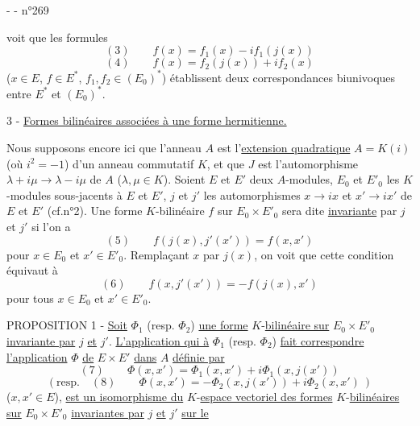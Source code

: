 -  -
\hfill n°269

voit que les formules
\[
(3)\qquad f(x)=f_1(x)-if_1(j(x))
\]
\[
(4)\qquad f(x)=f_2(j(x))+if_2(x)
\]
($x\in E$, $f\in E^*$, $f_1,f_2\in(E_0)^*$) établissent deux correspondances biunivoques entre $E^*$ et $(E_0)^*$.

3 - \uline{Formes bilinéaires associées à une forme hermitienne.}

Nous supposons encore ici que l'anneau $A$ est l'\uline{extension quadratique} $A=K(i)$ (où $i^2=-1$) d'un anneau commutatif $K$, et que $J$ est l'automorphisme $\lambda+i\mu\longrightarrow\lambda-i\mu$ de $A$ ($\lambda,\mu\in K$). Soient $E$ et $E'$ deux $A$-modules, $E_0$ et $E'_0$ les $K$-modules sous-jacents à $E$ et $E'$, $j$ et $j'$ les automorphismes $x\longrightarrow ix$ et $x'\longrightarrow ix'$ de $E$ et $E'$ (cf.n°2). Une forme $K$-bilinéaire $f$ sur $E_0\times E'_0$ sera dite \uline{invariante} par $j$ et $j'$ si l'on a
\[
(5)\qquad f(j(x),j'(x'))=f(x,x')
\]
pour $x\in E_0$ et $x'\in E'_0$. Remplaçant $x$ par $j(x)$, on voit que cette condition équivaut à
\[
(6)\qquad f(x,j'(x'))=-f(j(x),x')
\]
pour tous $x\in E_0$ et $x'\in E'_0$.

PROPOSITION 1 - \uline{Soit} $\Phi_1$ (resp. $\Phi_2$) \uline{une forme} $K$-\uline{bilinéaire sur} $E_0\times E'_0$ \uline{invariante par} $j$ \uline{et} $j'$. \uline{L'application qui à} $\Phi_1$ (resp. $\Phi_2$) \uline{fait correspondre l'application} $\Phi$ \uline{de} $E\times E'$ \uline{dans} $A$ \uline{définie par}
\[
(7)\qquad\Phi(x,x')=\Phi_1(x,x')+i\Phi_1(x,j(x'))
\]
\[
(\text{resp.}\quad(8)\qquad\Phi(x,x')=-\Phi_2(x,j(x'))+i\Phi_2(x,x')\ )
\]
($x,x'\in E$), \uline{est un isomorphisme du} $K$-\uline{espace vectoriel des formes} $K$-\uline{bilinéaires sur} $E_0\times E'_0$ \uline{invariantes par} $j$ \uline{et} $j'$ \uline{sur le}
